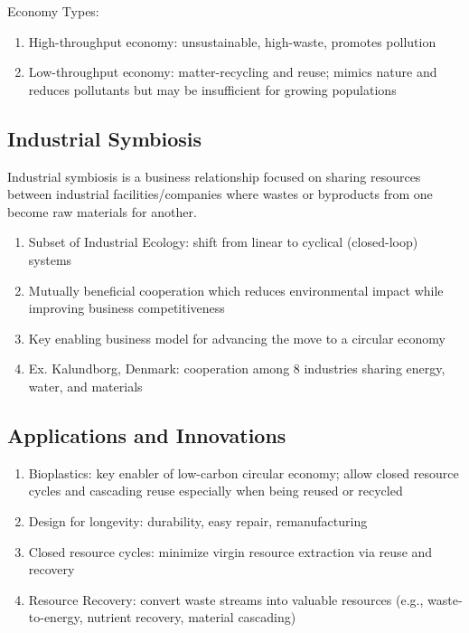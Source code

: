 \documentclass[12pt, a4paper]{article}
\begin{document}
\begin{multicols*}{3}
Economy Types:
\begin{enumerate}[\roman*.]
  \item High-throughput economy: unsustainable, high-waste, promotes pollution
  \item Low-throughput economy: matter-recycling and reuse; mimics nature and reduces pollutants but may be insufficient for growing populations
\end{enumerate}

\colbreak
\subsection{Industrial Symbiosis}

Industrial symbiosis is a business relationship focused on sharing resources between industrial facilities/companies where wastes or byproducts from one become raw materials for another.
\begin{enumerate}[\roman*.]
  \item Subset of Industrial Ecology: shift from linear to cyclical (closed-loop) systems
  \item Mutually beneficial cooperation which reduces environmental impact while improving business competitiveness
  \item Key enabling business model for advancing the move to a circular economy
  \item Ex. Kalundborg, Denmark: cooperation among 8 industries sharing energy, water, and materials 

\end{enumerate}

\subsection{Applications and Innovations}
\begin{enumerate}[\roman*.]
  \item Bioplastics: key enabler of low-carbon circular economy; allow closed resource cycles and cascading reuse especially when being reused or recycled
  \item Design for longevity: durability, easy repair, remanufacturing
  \item Closed resource cycles: minimize virgin resource extraction via reuse and recovery
  \item Resource Recovery: convert waste streams into valuable resources (e.g., waste-to-energy, nutrient recovery, material cascading)
\end{enumerate}
\colbreak


\end{multicols*}
\end{document}

